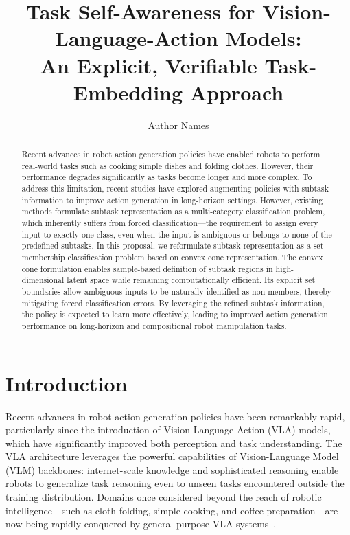 \documentclass[11pt]{article}
\title{Task Self-Awareness for Vision-Language-Action Models:\\
       An Explicit, Verifiable Task-Embedding Approach}
\author{Author Names}        %
\date{}
\begin{document}
\maketitle

\begin{abstract}
Recent advances in robot action generation policies have enabled robots to perform real-world tasks such as cooking simple dishes and folding clothes. However, their performance degrades significantly as tasks become longer and more complex. To address this limitation, recent studies have explored augmenting policies with subtask information to improve action generation in long-horizon settings. However, existing methods formulate subtask representation as a multi-category classification problem, which inherently suffers from forced classification---the requirement to assign every input to exactly one class, even when the input is ambiguous or belongs to none of the predefined subtasks. In this proposal, we reformulate subtask representation as a set-membership classification problem based on convex cone representation. The convex cone formulation enables sample-based definition of subtask regions in high-dimensional latent space while remaining computationally efficient. Its explicit set boundaries allow ambiguous inputs to be naturally identified as non-members, thereby mitigating forced classification errors. By leveraging the refined subtask information, the policy is expected to learn more effectively, leading to improved action generation performance on long-horizon and compositional robot manipulation tasks.
\end{abstract}

\section{Introduction}
\label{sec:intro}

Recent advances in robot action generation policies have been remarkably rapid, particularly since the introduction of Vision-Language-Action (VLA) models, which have significantly improved both perception and task understanding. The VLA architecture leverages the powerful capabilities of Vision-Language Model (VLM) backbones: internet-scale knowledge and sophisticated reasoning enable robots to generalize task reasoning even to unseen tasks encountered outside the training distribution. Domains once considered beyond the reach of robotic intelligence---such as cloth folding, simple cooking, and coffee preparation---are now being rapidly conquered by general-purpose VLA systems~\cite{openvla, pi0}.
\end{document}
